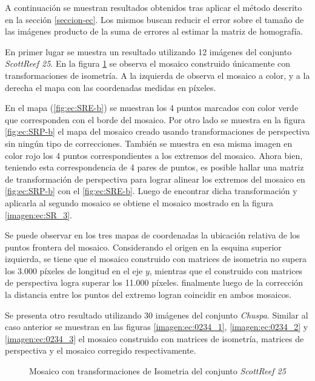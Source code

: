 A continuación se muestran resultados obtenidos tras aplicar el método descrito en la sección \ref{seccion-ec}. Los mismos buscan reducir el error sobre el tamaño de las imágenes producto de la suma de errores al estimar la matriz de homografía. 

En primer lugar se muestra un resultado utilizando 12 imágenes del conjunto \textit{ScottReef 25}. En la figura \ref{imagen:ec:SR_1} se observa el mosaico construido únicamente con transformaciones de isometría. A la izquierda de observa el mosaico a color, y a la derecha el mapa con las coordenadas medidas en píxeles.

En el mapa (\ref{fig:ec:SRE-b}) se muestran los 4 puntos marcados con color verde que corresponden con el borde del mosaico. Por otro lado se muestra en la figura \ref{fig:ec:SRP-b} el mapa del mosaico creado usando transformaciones de perspectiva sin ningún tipo de correcciones. También se muestra en esa misma imagen en color rojo los 4 puntos correspondientes a los extremos del mosaico. Ahora bien, teniendo esta correspondencia de 4 pares de puntos, es posible hallar una matriz de transformación de perspectiva para lograr alinear los extremos del mosaico en \ref{fig:ec:SRP-b} con el \ref{fig:ec:SRE-b}. Luego de encontrar dicha transformación y aplicarla al segundo mosaico se obtiene el mosaico mostrado en la figura  \ref{imagen:ec:SR_3}.

Se puede observar en los tres mapas de coordenadas la ubicación relativa de los puntos frontera del mosaico. Considerando el origen en la esquina superior izquierda, se tiene que el mosaico construido con matrices de isometria no supera los 3.000 píxeles de longitud en el eje $y$, mientras que el construido con matrices de perspectiva logra superar los 11.000 píxeles. finalmente luego de la corrección la distancia entre los puntos del extremo logran coincidir en ambos mosaicos.


Se presenta otro resultado utilizando 30 imágenes del conjunto \textit{Chuspa}. Similar al caso anterior se muestran en las figuras \ref{imagen:ec:0234_1}, \ref{imagen:ec:0234_2} y \ref{imagen:ec:0234_3} el mosaico construido con matrices de isometría, matrices de perspectiva y el mosaico corregido respectivamente.

\begin{figure}[H]
	\centering     %
	\hspace{1mm}%
	\hspace{1mm}%
	\caption[Mosaico con transformaciones de Isometria]{Mosaico con transformaciones de Isometria del conjunto \textit{ScottReef 25}}
	\label{imagen:ec:SR_1}
\end{figure}

